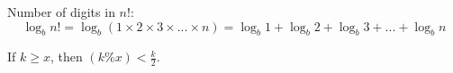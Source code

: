 Number of digits in $n!$:
  $$ \log _{b} n! = \log _{b} (1 \times 2 \times 3 \times ... \times n) = \log _{b} 1 + \log _{b} 2 + \log _{b} 3 + ... + \log _{b} n $$

If $k \geq x$, then $(k \% x) < \frac{k}{2}$.